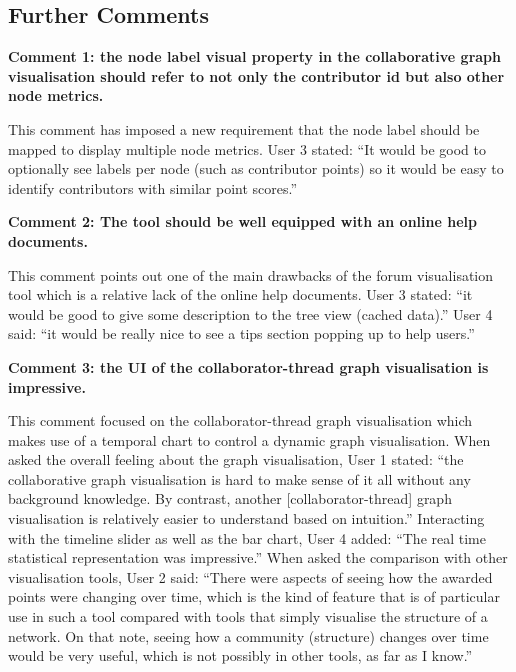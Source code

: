 \subsection{Further Comments}
\textbf{Comment 1: the node label visual property in the collaborative graph visualisation should refer to not only the contributor id but also other node metrics.}

This comment has imposed a new requirement that the node label should be mapped to display multiple node metrics. User 3 stated: ``It would be good to optionally see labels per node (such as contributor points) so it would be easy to identify contributors with similar point scores.''

\textbf{Comment 2: The tool should be well equipped with an online help documents.}

This comment points out one of the main drawbacks of the forum visualisation tool which is a relative lack of the online help documents. User 3 stated: ``it would be good to give some description to the tree view (cached data).'' User 4 said: ``it would be really nice to see a tips section popping up to help users.''

\textbf{Comment 3: the UI of the collaborator-thread graph visualisation is impressive.}

This comment focused on the collaborator-thread graph visualisation which makes use of a temporal chart to control a dynamic graph visualisation. When asked the overall feeling about the graph visualisation, User 1 stated: ``the collaborative graph visualisation is hard to make sense of it all without any background knowledge. By contrast, another [collaborator-thread] graph visualisation is relatively easier to understand based on intuition.'' Interacting with the timeline slider as well as the bar chart, User 4 added: ``The real time statistical representation was impressive.'' When asked the comparison with other visualisation tools, User 2 said: ``There were aspects of seeing how the awarded points were changing over time, which is the kind of feature that is of particular use in such a tool compared with tools that simply visualise the structure of a network. On that note, seeing how a community (structure) changes over time would be very useful, which is not possibly in other tools, as far as I know.''

